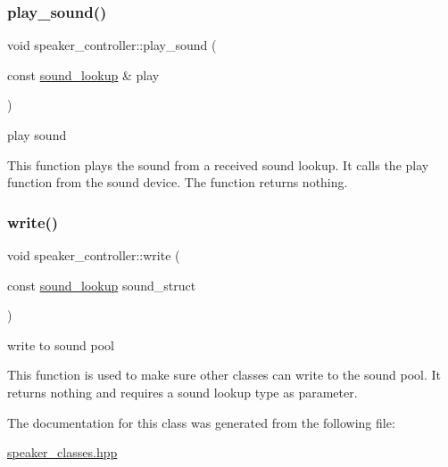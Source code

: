 \subsubsection{\texorpdfstring{play\+\_\+sound()}{play\_sound()}}
{\footnotesize\ttfamily void speaker\+\_\+controller\+::play\+\_\+sound (\begin{DoxyParamCaption}\item[{const \hyperlink{structsound__lookup}{sound\+\_\+lookup} \&}]{play }\end{DoxyParamCaption})\hspace{0.3cm}{\ttfamily [inline]}}



play sound 

This function plays the sound from a received sound lookup. It calls the play function from the sound device. The function returns nothing. \hypertarget{classspeaker__controller_a7596b187aa529529886992fd6545bcab}{}\label{classspeaker__controller_a7596b187aa529529886992fd6545bcab} 
\subsubsection{\texorpdfstring{write()}{write()}}
{\footnotesize\ttfamily void speaker\+\_\+controller\+::write (\begin{DoxyParamCaption}\item[{const \hyperlink{structsound__lookup}{sound\+\_\+lookup}}]{sound\+\_\+struct }\end{DoxyParamCaption})\hspace{0.3cm}{\ttfamily [inline]}}



write to sound pool 

This function is used to make sure other classes can write to the sound pool. It returns nothing and requires a sound lookup type as parameter. 

The documentation for this class was generated from the following file\+:\begin{DoxyCompactItemize}
\item 
\hyperlink{speaker__classes_8hpp}{speaker\+\_\+classes.\+hpp}\end{DoxyCompactItemize}
